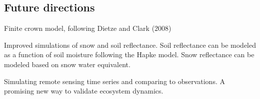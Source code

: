 \subsection{Future directions}

Finite crown model, following Dietze and Clark (2008)\nocite{}

Improved simulations of snow and soil reflectance.
Soil reflectance can be modeled as a function of soil moisture following the Hapke model\cite{HAPKE}.
Snow reflectance can be modeled based on snow water equivalent\cite{SWE}.

Simulating remote sensing time series and comparing to observations.
A promising new way to validate ecosystem dynamics.

